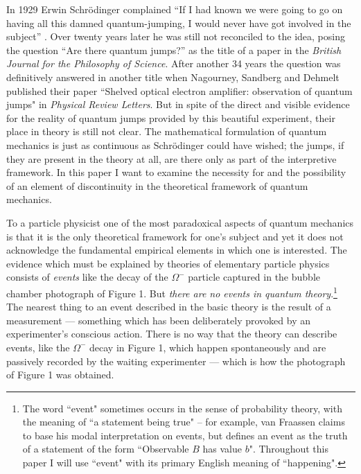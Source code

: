 \documentclass[12pt,a4paper,reqno]{article}
\renewcommand{\(}{\left(}
\renewcommand{\)}{\right)}
\newcommand{\<}{\langle}
\renewcommand{\>}{\rangle}
\theoremstyle{plain} %
\theoremstyle{definition}
\theoremstyle{remark}
\begin{document}
In 1929 Erwin Schr\"odinger complained ``If I had known we were going 
to go on having all this damned quantum-jumping, I would never have got 
involved in the subject'' \cite{Schrquote}. Over twenty years later he was 
still not reconciled to the idea, posing the question ``Are there quantum 
jumps?'' as the title of a paper in the {\em British Journal for the Philosophy 
of Science}. After another 34 years the question was definitively answered 
in another title when Nagourney, Sandberg and Dehmelt published their 
paper ``Shelved optical electron amplifier: observation of quantum jumps" 
in {\em Physical Review Letters}. But in spite of the direct and visible 
evidence for the reality of quantum jumps provided by this beautiful experiment, 
their place in theory is still not clear. The mathematical formulation 
of quantum mechanics is just as continuous as Schr\"odinger could have 
wished; the jumps, if they are present in the theory at all, are there 
only as part of the interpretive framework. In this paper I want to examine 
the necessity for and the possibility of an element of discontinuity in 
the theoretical framework of quantum mechanics. 

To a particle physicist one of the most paradoxical aspects of quantum 
mechanics is that it is the only theoretical framework for one's subject
 and yet it does not acknowledge the fundamental empirical elements in 
which one is interested. The evidence which must be explained by
theories of  elementary particle physics consists of {\em events} like
the decay of  the $\Omega^-$ particle captured in the bubble chamber
photograph of Figure  1. But {\em there are no events in quantum
theory}.\footnote{The word ``event" sometimes occurs in the sense of
probability theory, with the meaning of ``a statement being true" -- for
example, van Fraassen \cite{vanFraassen} claims to base his modal
interpretation on events, but defines an event as the truth of a
statement of the form ``Observable $B$ has value $b$". Throughout this
paper I will use ``event" with its primary English meaning of
``happening".} The nearest thing to an event described in the basic
theory  is the result of a measurement --- something which has been
deliberately  provoked by an experimenter's conscious action. There is
no way that the  theory can describe events, like the $\Omega^-$ decay
in Figure 1, which  happen spontaneously and are passively recorded by
the waiting experimenter  --- which is how the photograph of Figure 1
was obtained. 
\end{document}
